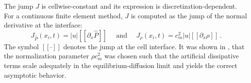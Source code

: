 \documentclass[times,doublespace]{fldauth}%
\begin{document}
The jump $J$ is cellwise-constant and its expression is discretization-dependent. For a continuous finite element method, $J$ is computed as the
jump of the normal derivative at the interface: 
\begin{equation}
J_{\hat{P}}(x_i,t) = |u| [[\partial_x \hat{P}]] \quad \text{ and } \quad 
J_{\rho}(x_i,t) = c_m^2 |u|  [[\partial_x \rho]] \,.
\end{equation}
The symbol $[[ \cdot ]]$ denotes the jump at the cell interface. It was shown in \cite{our_jcp_radhy_paper}, that the normalization parameter $\rho c^2_m$ 
was chosen such that the artificial dissipative terms scale adequately in the equilibrium-diffusion limit and yields the correct asymptotic behavior. 
\end{document}
